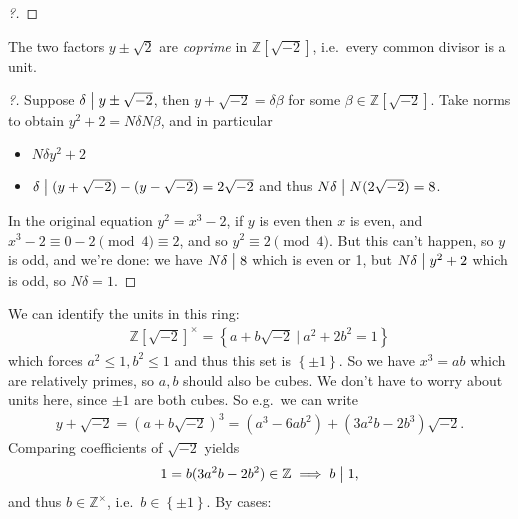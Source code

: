 \begin{example}[Fermat]
\begin{proof}[?]
\end{proof}

\begin{claim}

The two factors \(y \pm \sqrt 2\) are \emph{coprime} in
\({\mathbb{Z}}[\sqrt{-2}]\), i.e.~every common divisor is a unit.

\end{claim}

\begin{proof}[?]

Suppose \(\delta\bigm|y\pm \sqrt{-2}\), then
\(y + \sqrt{-2} = \delta \beta\) for some
\(\beta\in {\mathbb{Z}}[\sqrt{-2}]\). Take norms to obtain
\(y^2 + 2 = N \delta N \beta\), and in particular

\begin{itemize}
\tightlist
\item
  \(N \delta y^2 +2\)
\item
  \(\delta \bigm|(y+ \sqrt{-2} ) - (y - \sqrt{-2} ) = 2 \sqrt{-2}\) and
  thus \(N \delta \bigm|N(2 \sqrt{-2} ) = 8\).
\end{itemize}

In the original equation \(y^2 = x^3-2\), if \(y\) is even then \(x\) is
even, and \(x^3 - 2 \equiv 0-2 \pmod 4 \equiv 2\), and so
\(y^2 \equiv 2 \pmod 4\). But this can't happen, so \(y\) is odd, and
we're done: we have \(N \delta\bigm|8\) which is even or 1, but
\(N \delta\bigm|y^2 +2\) which is odd, so \(N \delta = 1\).

\end{proof}

We can identify the units in this ring:
\begin{align*}
{\mathbb{Z}}[\sqrt{-2} ]^{\times}= \left\{{ a + b \sqrt{-2} {~\mathrel{\Big|}~}a^2 + 2b^2 = 1}\right\}
\end{align*}
which forces \(a^2 \leq 1, b^2 \leq 1\) and thus this set is
\(\left\{{\pm 1}\right\}\). So we have \(x^3 = ab\) which are relatively
primes, so \(a,b\) should also be cubes. We don't have to worry about
units here, since \(\pm 1\) are both cubes. So e.g.~we can write
\begin{align*}
y + \sqrt{-2} = (a + b \sqrt{-2} )^3 = (a^3-6ab^2) + (3a^2b -2b^3) \sqrt{-2}
.\end{align*}
Comparing coefficients of \(\sqrt{-2}\) yields
\begin{align*} 1 = b(3a^2b - 2b^2) \in {\mathbb{Z}}\implies b \bigm|1
,\end{align*}
and thus \(b\in {\mathbb{Z}}^{\times}\),
i.e.~\(b\in \left\{{\pm 1}\right\}\). By cases:


\end{example}
